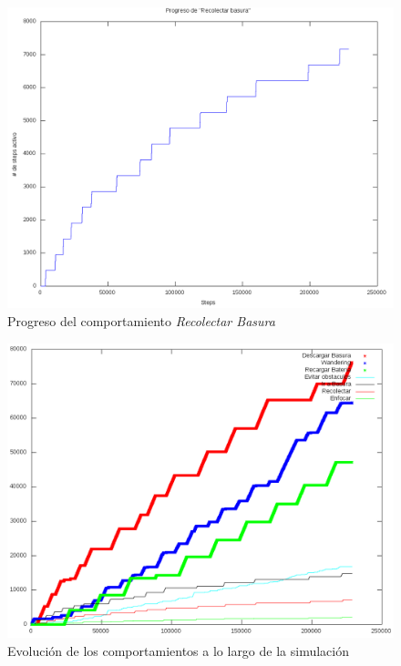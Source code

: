 \begin{figure}[htp]
\begin{center}
\includegraphics[scale=0.25]{comportamientos/graphics/CollectUse.png}
\caption{Progreso del comportamiento \emph{Recolectar Basura}}
\label{fig:collectEvolution}
\end{center}
\end{figure}

\begin{figure}[htp]
\begin{center}
\includegraphics[scale=0.25]{comportamientos/graphics/AllUse.png}
\caption{Evoluci\'on de los comportamientos a lo largo de la simulaci\'on}
\label{fig:behaviourEvolution}
\end{center}
\end{figure}

